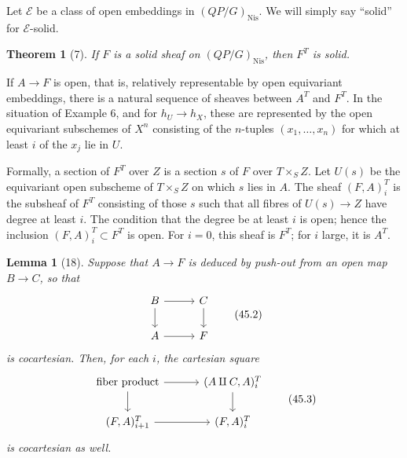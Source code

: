 \documentclass[11pt]{article}
\newcommand{\Nis}{\mathrm{Nis}}
\theoremstyle{deligne}
\newtheorem*{theorem*}{Theorem}
\newtheorem*{lemma*}{Lemma}
\begin{document}
Let \(\mathcal E\) be a class of open embeddings in \((QP/G)_{\Nis}\). We will simply say ``solid'' for \(\mathcal E\)-solid.

\begin{theorem*}[7]
If \(F\) is a solid sheaf on \((QP/G)_{\Nis}\), then \(F^T\) is solid.
\end{theorem*}

If \(A\to F\) is open, that is, relatively representable by open equivariant embeddings, there is a natural sequence of sheaves between \(A^T\) and \(F^T\). In the situation of Example 6, and for \(h_U\to h_X\), these are represented by the open equivariant subschemes of \(X^n\) consisting of the \(n\)-tuples \((x_1,\ldots,x_n)\) for which at least \(i\) of the \(x_j\) lie in \(U\).

Formally, a section of \(F^T\) over \(Z\) is a section \(s\) of \(F\) over \(T\times_S Z\). Let \(U(s)\) be the equivariant open subscheme of \(T\times_S Z\) on which \(s\) lies in \(A\). The sheaf \((F,A)^T_i\) is the subsheaf of \(F^T\) consisting of those \(s\) such that all fibres of \(U(s)\to Z\) have degree at least \(i\). The condition that the degree be at least \(i\) is open; hence the inclusion \((F,A)^T_i\subset F^T\) is open. For \(i=0\), this sheaf is \(F^T\); for \(i\) large, it is \(A^T\).

\begin{lemma*}[18]
Suppose that \(A\to F\) is deduced by push-out from an open map \(B\to C\), so that
\[
\begin{tikzcd}[column sep=2.8em,row sep=1.8em]
B \arrow[r] \arrow[d] & C \arrow[d]\\
A \arrow[r] & F
\end{tikzcd}
\tag{45.2}
\]
is cocartesian. Then, for each \(i\), the cartesian square
\[
\begin{tikzcd}[column sep=3.2em,row sep=1.8em]
\text{fiber product} \arrow[r] \arrow[d] &
(A\amalg C,A)^T_i \arrow[d]\\
(F,A)^T_{i+1} \arrow[r] &
(F,A)^T_i
\end{tikzcd}
\tag{45.3}
\]
is cocartesian as well.
\end{lemma*}
\end{document}
